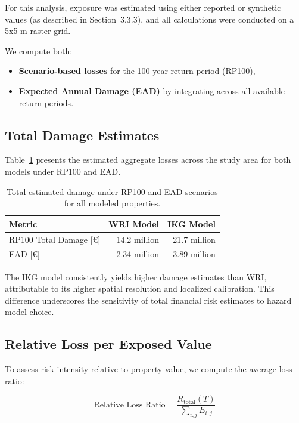 For this analysis, exposure was estimated using either reported or synthetic values (as described in Section~3.3.3), and all calculations were conducted on a 5x5 m raster grid.

We compute both:
\begin{itemize}
	\item \textbf{Scenario-based losses} for the 100-year return period (RP100),
	\item \textbf{Expected Annual Damage (EAD)} by integrating across all available return periods.
\end{itemize}

\subsection{Total Damage Estimates}

Table~\ref{tab:total-damage-estimates} presents the estimated aggregate losses across the study area for both models under RP100 and EAD.

\begin{table}[htb]
    \centering
    \caption{Total estimated damage under RP100 and EAD scenarios for all modeled properties.}
    \label{tab:total-damage-estimates}
    \begin{tabular}{|l|r|r|}
        \hline
        \textbf{Metric} & \textbf{WRI Model} & \textbf{IKG Model} \\
        \hline
        RP100 Total Damage [€] & 14.2 million & 21.7 million \\
        EAD [€] & 2.34 million & 3.89 million \\
        \hline
    \end{tabular}
\end{table}

The IKG model consistently yields higher damage estimates than WRI, attributable to its higher spatial resolution and localized calibration. This difference underscores the sensitivity of total financial risk estimates to hazard model choice.

\subsection{Relative Loss per Exposed Value}

To assess risk intensity relative to property value, we compute the average loss ratio:

\begin{equation}
	\text{Relative Loss Ratio} = \frac{R_{\text{total}}(T)}{\sum_{i,j} E_{i,j}}
\end{equation}

